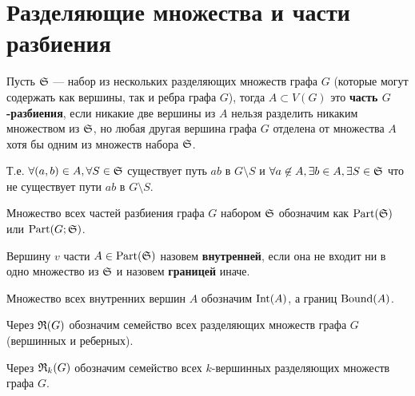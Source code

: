 
\setcounter{section}{-1}
\section{Разделяющие множества и части разбиения}

\begin{df}
	Пусть $\S$ — набор из нескольких разделяющих множеств графа $G$ (которые могут содержать как вершины, так и ребра графа $G$), тогда $A \subset V(G)$ это \textbf{часть $G$-разбиения}, если никакие две вершины из $A$ нельзя разделить никаким множеством из $\S$, но любая другая вершина графа $G$ отделена от множества $A$ хотя бы одним из множеств набора $\S$. 

	Т.е. $\forall (a, b) \in A, \forall S \in \S$ существует путь $ab$ в $G \setminus S$ и $\forall a \not \in A, \exists b \in A, \exists S \in \S$ что не существует пути $ab$ в $G \setminus S$.
\end{df}

\begin{prop}
	Множество всех частей разбиения графа $G$ набором $\S$ обозначим как $\Part(\S)$ или $\Part(G; \S)$.
\end{prop}

\begin{df}
	Вершину $v$ части $A \in \Part(\S)$ назовем \textbf{внутренней}, если она не входит ни в одно множество из $\S$ и назовем \textbf{границей} иначе.

	Множество всех внутренних вершин $A$ обозначим $\Int(A)$, а границ $\Bound(A)$.
\end{df}

\begin{prop}
	Через $\R(G)$ обозначим семейство всех разделяющих множеств графа $G$(вершинных и реберных).

	Через $\R_k(G)$ обозначим семейство всех $k$-вершинных разделяющих множеств графа $G$.
\end{prop}

